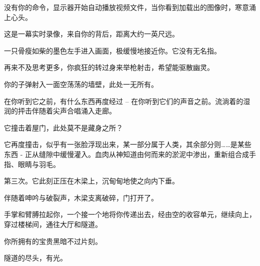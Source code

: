 \hr


\newpage

\begin{scpbox}

没有你的命令，显示器开始自动播放视频文件，当你看到加载出的图像时，寒意涌上心头。

这是一幕实时录像，来自你的背后，距离大约一英尺远。

一只骨瘦如柴的墨色左手进入画面，极缓慢地接近你。它没有无名指。

再来不及思考更多，你疯狂的转过身来举枪射击，希望能驱散幽灵。

你的子弹射入一面空荡荡的墙壁，此处一无所有。

在你听到它之前，有什么东西再度经过 – 在你听到它们的声音之前。流淌着的湿润的抨击伴随着尖声合唱涌入走廊。

它撞击着屋门，此处莫不是藏身之所？

它再度撞击，似乎有一张脸浮现出来，某一部分属于人类，其余部分则……是某些东西 - 正从缝隙中缓慢灌入。血肉从神知道由何而来的淤泥中渗出，重新组合成手指、眼睛与羽毛。

第三次。它此刻正压在木梁上，沉甸甸地使之向内下垂。

伴随着呻吟与破裂声，木梁支离破碎，门打开了。

手掌和臂膊拉起你，一个接一个地将你传递出去，经由空的收容单元，继续向上，穿过楼梯间，通往大厅和隧道。

你所拥有的宝贵黑暗不过片刻。

隧道的尽头，有光。

\end{scpbox}
